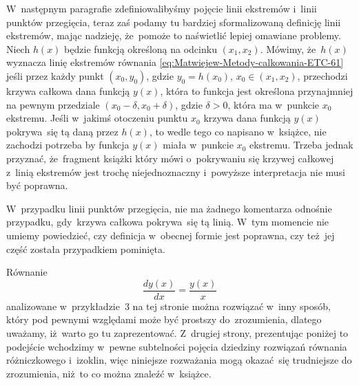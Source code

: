 \documentclass[a4paper,11pt]{article}
\numberwithin{equation}{section}
\begin{document}
W~następnym paragrafie zdefiniowalibyśmy pojęcie linii ekstremów i~linii
punktów przegięcia, teraz zaś podamy tu bardziej sformalizowaną definicję
linii ekstremów, mając nadzieję, że~pomoże to naświetlić lepiej omawiane
problemy. Niech $h( x )$ będzie funkcją określoną na odcinku
$( x_{ 1 }, x_{ 2 } )$.
Mówimy, że~$h( x )$ wyznacza linię ekstremów równania
\eqref{eq:Matwiejew-Metody-calkowania-ETC-61} jeśli przez każdy
punkt $( x_{ 0 }, y_{ 0 } )$, gdzie $y_{ 0 } = h( x_{ 0 } )$,
$x_{ 0 } \in ( x_{ 1 }, x_{ 2 } )$, przechodzi
krzywa całkowa dana funkcją $y( x )$, która to funkcja jest określona
przynajmniej na pewnym przedziale $( x_{ 0 } - \delta, x_{ 0 } + \delta )$, gdzie
$\delta > 0$, która ma w~punkcie $x_{ 0 }$ ekstremu. Jeśli w~jakimś otoczeniu
punktu $x_{ 0 }$ krzywa dana funkcją $y( x )$ pokrywa~się tą daną przez
$h( x )$, to wedle tego co napisano w~książce, nie zachodzi potrzeba by
funkcja $y( x )$ miała w~punkcie $x_{ 0 }$ ekstremu. Trzeba jednak
przyznać, że~fragment książki który mówi o~pokrywaniu się krzywej całkowej
z~linią ekstremów jest trochę niejednoznaczny i~powyższe interpretacja nie
musi być poprawna.

W~przypadku linii punktów przegięcia, nie ma żadnego komentarza odnośnie
przypadku, gdy~krzywa całkowa pokrywa~się tą linią. W~tym momencie nie
umiemy powiedzieć, czy definicja w~obecnej formie jest poprawna, czy
też~jej część została przypadkiem pominięta.

\VerSpaceFour





\noindent
{} Równanie
\begin{equation}
  \label{eq:Matwiejew-Metody-calkowania-ETC-63}
  \frac{ d y( x ) }{ d x } =
  \frac{ y( x ) }{ x }
\end{equation}
analizowane w~przykładzie~3 na tej stronie można rozwiązać w~inny sposób,
który pod pewnymi względami może być prostszy do~zrozumienia, dlatego
uważamy, iż~warto go tu zaprezentować. Z~drugiej
strony, prezentując poniżej to podejście wchodzimy w~pewne subtelności
pojęcia dziedziny rozwiązań równania różniczkowego i~izoklin, więc niniejsze
rozważania mogą okazać~się trudniejsze do zrozumienia, niż~to co można
znaleźć w~książce.
\end{document}
